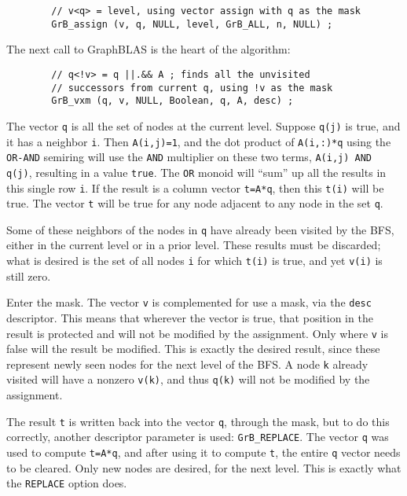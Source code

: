 \documentclass[12pt]{article}
\begin{document}
        {\footnotesize
        \begin{verbatim}
        // v<q> = level, using vector assign with q as the mask
        GrB_assign (v, q, NULL, level, GrB_ALL, n, NULL) ; \end{verbatim}}

The next call to GraphBLAS is the heart of the algorithm:

        {\footnotesize
        \begin{verbatim}
        // q<!v> = q ||.&& A ; finds all the unvisited
        // successors from current q, using !v as the mask
        GrB_vxm (q, v, NULL, Boolean, q, A, desc) ; \end{verbatim}}

The vector \verb'q' is all the set of nodes at the current level.  Suppose
\verb'q(j)' is true, and it has a neighbor \verb'i'.  Then \verb'A(i,j)=1', and
the dot product of \verb'A(i,:)*q' using the \verb'OR-AND' semiring will use
the \verb'AND' multiplier on these two terms, \verb'A(i,j) AND q(j)', resulting
in a value \verb'true'.  The \verb'OR' monoid will ``sum'' up all the results
in this single row \verb'i'.  If the result is a column vector \verb't=A*q',
then this \verb't(i)' will be true.  The vector \verb't' will be true for
any node adjacent to any node in the set \verb'q'.

Some of these neighbors of the nodes in \verb'q' have already been visited by
the BFS, either in the current level or in a prior level.  These results must
be discarded; what is desired is the set of all nodes \verb'i' for which
\verb't(i)' is true, and yet \verb'v(i)' is still zero.

Enter the mask.  The vector \verb'v' is complemented for use a mask, via the
\verb'desc' descriptor.  This means that wherever the vector is true, that
position in the result is protected and will not be modified by the assignment.
Only where \verb'v' is false will the result be modified.  This is exactly the
desired result, since these represent newly seen nodes for the next level of
the BFS.  A node \verb'k' already visited will have a nonzero \verb'v(k)', and
thus \verb'q(k)' will not be modified by the assignment.

The result \verb't' is written back into the vector \verb'q', through the mask,
but to do this correctly, another descriptor parameter is used:
\verb'GrB_REPLACE'.  The vector \verb'q' was used to compute \verb't=A*q', and
after using it to compute \verb't', the entire \verb'q' vector needs to be
cleared.  Only new nodes are desired, for the next level.  This is exactly what
the \verb'REPLACE' option does.
\end{document}

